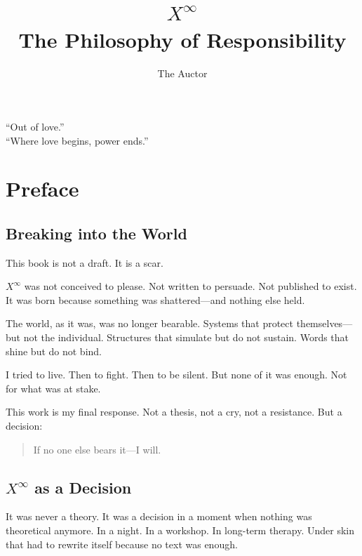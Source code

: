 \documentclass[12pt,a4paper]{book}
\begin{document}
\frontmatter
\title{\Huge \textbf{$X^\infty$}\\[0.5em]The Philosophy of Responsibility}
\author{The Auctor}
\date{}
\maketitle

\cleardoublepage
\thispagestyle{empty}
\begin{center}
    \enquote{Out of love.} \\
    \enquote{Where love begins, power ends.}
\end{center}
\cleardoublepage
\tableofcontents

\mainmatter

\chapter*{Preface}

\section*{Breaking into the World}

This book is not a draft. It is a scar.

$X^\infty$ was not conceived to please. Not written to persuade. Not published to exist.
It was born because something was shattered—and nothing else held.

The world, as it was, was no longer bearable. Systems that protect themselves—but not the individual. Structures that simulate but do not sustain. Words that shine but do not bind.

I tried to live. Then to fight. Then to be silent. But none of it was enough. Not for what was at stake.

This work is my final response. Not a thesis, not a cry, not a resistance. But a decision:

\begin{quote}
If no one else bears it—I will.
\end{quote}

\section*{$X^\infty$ as a Decision}

It was never a theory. It was a decision in a moment when nothing was theoretical anymore.
In a night. In a workshop. In long-term therapy. Under skin that had to rewrite itself because no text was enough.
\end{document}
